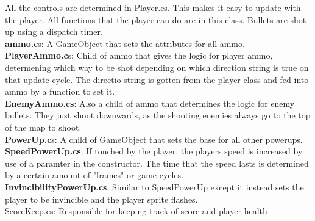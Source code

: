 \documentclass[10pt,conference,onecolumn,compsoc]{IEEEtran}
\begin{document}
All the controls are determined in Player.cs. This makes it easy to update with the player. All functions that the player can do are in 
this class. Bullets are shot up using a dispatch timer.\\
\textbf{ammo.c}s: A GameObject that sets the attributes for all ammo.\\
\textbf{PlayerAmmo.c}s: Child of ammo that gives the logic for player ammo, determening which way to be shot depending on which direction string is 
true on that update cycle. The directio string is gotten from the player class and fed into ammo by a function to set it.\\
\textbf{EnemyAmmo.cs}: Also a child of ammo that determines the logic for enemy bullets. They just shoot downwards, as the shooting enemies always
go to the top of the map to shoot.\\
\textbf{PowerUp.c}s: A child of GameObject that sets the base for all other powerups.\\
\textbf{SpeedPowerUp.cs}: If touched by the player, the players speed is increased by use of a paramter in the constructor. The time that the speed
lasts is determined by a certain amount of "frames" or game cycles.\\
\textbf{InvincibilityPowerUp.cs}: Similar to SpeedPowerUp except it instead sets the player to be invincible and the player sprite flashes.\\
ScoreKeep.cs: Responsible for keeping track of score and player health \\
\end{document}
